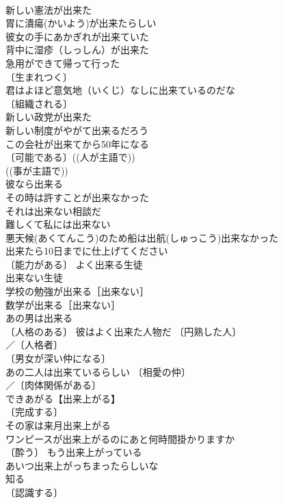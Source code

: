 \documentclass[8pt]{extreport}
\begin{document}
\begin{CJK}{UTF8}{min}
\\	新しい憲法が出来た 
\\	胃に潰瘍(かいよう)が出来たらしい 
\\	彼女の手にあかぎれが出来ていた 
\\	背中に湿疹（しっしん）が出来た 
\\	急用ができて帰って行った 
\\	〔生まれつく〕　
\\	君はよほど意気地（いくじ）なしに出来ているのだな 
\\	〔組織される〕
\\	新しい政党が出来た 
\\	新しい制度がやがて出来るだろう 
\\	この会社が出来てから50年になる 
\\	〔可能である〕((人が主語で)) 
\\	((事が主語で)) 
\\	彼なら出来る 
\\	その時は許すことが出来なかった 
\\	それは出来ない相談だ 
\\	難しくて私には出来ない 
\\	悪天候(あくてんこう)のため船は出航(しゅっこう)出来なかった 
\\	出来たら10日までに仕上げてください 
\\	〔能力がある〕 よく出来る生徒 
\\	出来ない生徒 
\\	学校の勉強が出来る［出来ない］ 
\\	数学が出来る［出来ない］ 
\\	あの男は出来る 
\\	〔人格のある〕 彼はよく出来た人物だ 〔円熟した人〕
\\	／〔人格者〕
\\	〔男女が深い仲になる〕　
\\	あの二人は出来ているらしい 〔相愛の仲〕
\\	／〔肉体関係がある〕
\\	できあがる【出来上がる】 
\\	〔完成する〕
\\	その家は来月出来上がる 
\\	ワンピースが出来上がるのにあと何時間掛かりますか 
\\	〔酔う〕 もう出来上がっている 
\\	あいつ出来上がっちまったらしいな 
\\	知る	
\\	〔認識する〕

\end{CJK}
\end{document}
